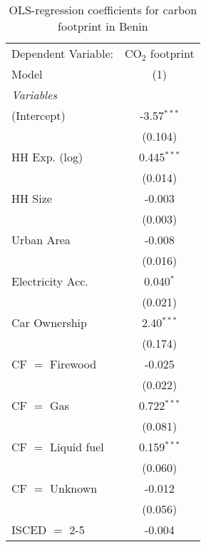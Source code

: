 
\begin{table}[htbp!]
   \centering
   \small
   \begin{adjustbox}{width = 1\textwidth, max height = 0.95\textheight, center}
      \begin{threeparttable}[b]
         \caption{\label{tab:OLS_2_BEN} OLS-regression coefficients for carbon footprint in Benin}
         \begin{tabular}{lc}
            \tabularnewline \midrule \midrule
            Dependent Variable: & CO$_{2}$ footprint\\  
            Model               & (1)\\  
            \midrule
            \emph{Variables}\\
            (Intercept)         & -3.57$^{***}$\\   
                                & (0.104)\\   
            HH Exp. (log)       & 0.445$^{***}$\\   
                                & (0.014)\\   
            HH Size             & -0.003\\   
                                & (0.003)\\   
            Urban Area          & -0.008\\   
                                & (0.016)\\   
            Electricity Acc.    & 0.040$^{*}$\\   
                                & (0.021)\\   
            Car Ownership       & 2.40$^{***}$\\   
                                & (0.174)\\   
            CF $=$ Firewood     & -0.025\\   
                                & (0.022)\\   
            CF $=$ Gas          & 0.722$^{***}$\\   
                                & (0.081)\\   
            CF $=$ Liquid fuel  & 0.159$^{***}$\\   
                                & (0.060)\\   
            CF $=$ Unknown      & -0.012\\   
                                & (0.056)\\   
            ISCED $=$ 2-5       & -0.004\\   

\end{tabular}
\end{threeparttable}
\end{adjustbox}
\end{table}

